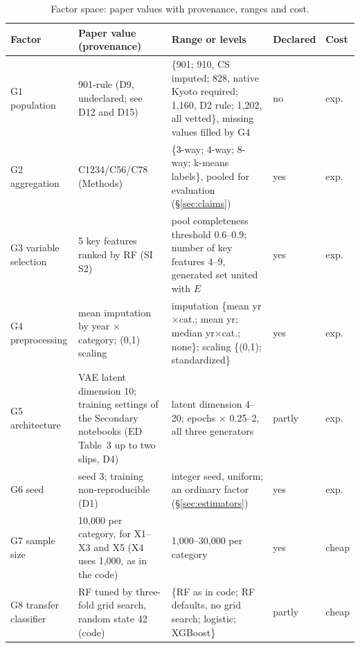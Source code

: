 \documentclass[11pt,a4paper]{article}
\newcommand{\prop}[1]{#1}
\newcommand{\prop}[1]{\textcolor{blue}{#1}}
\begin{document}
\begin{table}[H]
\caption{Factor space: paper values with provenance, ranges and cost.}
\label{tab:factors}
\footnotesize
\begin{tabularx}{\textwidth}{@{}l Y Y l l@{}}
\toprule
Factor & Paper value (provenance) & Range or levels & Declared & Cost\\
\midrule
G1 population & 901-rule (D9, undeclared; see D12 and D15) &
  \{901; 910, CS imputed; 828, \prop{native} Kyoto required; 1{,}160, D2 rule;
  1{,}202, all vetted\}, missing values filled by G4 & no & exp.\\
G2 aggregation & C1234/C56/C78 (Methods) &
  \{3-way; 4-way; 8-way; k-means labels\}, pooled for evaluation
  (\S\ref{sec:claims}) & yes & exp.\\
G3 variable selection & 5 key features ranked by RF (SI S2) &
  pool completeness threshold 0.6--0.9; number of key features 4--9,
  generated set united with $E$ & yes & exp.\\
G4 preprocessing & mean imputation by year $\times$ category; (0,1)
  scaling & imputation \{mean yr$\times$cat.; mean yr; median
  yr$\times$cat.; none\}; scaling \{(0,1); standardized\} & yes & exp.\\
G5 architecture & VAE latent dimension 10; training settings of the
  Secondary notebooks (ED Table~3 up to two slips, D4) & latent dimension
  4--20; epochs $\times$ 0.25--2, all three generators & partly & exp.\\
G6 seed & seed 3; training non-reproducible (D1) & integer seed,
  uniform; an ordinary factor (\S\ref{sec:estimators}) & yes & exp.\\
G7 sample size & 10{,}000 per category, for X1--X3 and X5 (X4
  uses 1{,}000, as in the code) & 1{,}000--30{,}000 per category & yes & cheap\\
G8 transfer classifier & RF tuned by three-fold grid search, random
  state 42 (code) & \{RF as in code; RF defaults, no grid search;
  logistic; XGBoost\} & partly & cheap\\
\bottomrule
\end{tabularx}
\end{table}
\end{document}
